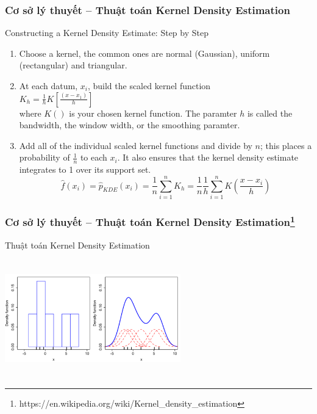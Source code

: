 \documentclass[t]{beamer}
\begin{document}

\begin{frame}[t]
\frametitle{Cơ sở lý thuyết -- Thuật toán Kernel Density Estimation}
Constructing a Kernel Density Estimate: Step by Step
\begin{enumerate}
\item Choose a kernel, the common ones are normal (Gaussian), uniform (rectangular) and triangular.
\item At each datum, $x_i$, build the scaled kernel function\\
$K_h = \frac{1}{h}K[\frac{(x-x_1)}{h}]$\\
where $K()$ is your chosen kernel function. The paramter $h$ is called the bandwidth, the window width, or the smoothing paramter.
\item Add all of the individual scaled kernel functions and divide by $n$; this places a probability of $\frac{1}{n}$ to each $x_i$. It also ensures that the kernel density estimate integrates to 1 over its support set.\\
\[
\hat{f}(x_i) = \hat{p}_{KDE}(x_i) = \frac{1}{n}\sum_{i=1}^{n} K_h = \frac{1}{n}\frac{1}{h}\sum_{i=1}^{n} K(\frac{x-x_i}{h})
\]
\end{enumerate}
\end{frame}


\begin{frame}
\frametitle{Cơ sở lý thuyết -- Thuật toán Kernel Density Estimation\footnote{https://en.wikipedia.org/wiki/Kernel\_density\_estimation}}
Thuật toán Kernel Density Estimation
\begin{center}
\includegraphics[height=2in,width=3in]{500px-Comparison_of_1D_histogram_and_KDE.png}
\end{center}
\end{frame}

\end{document}
